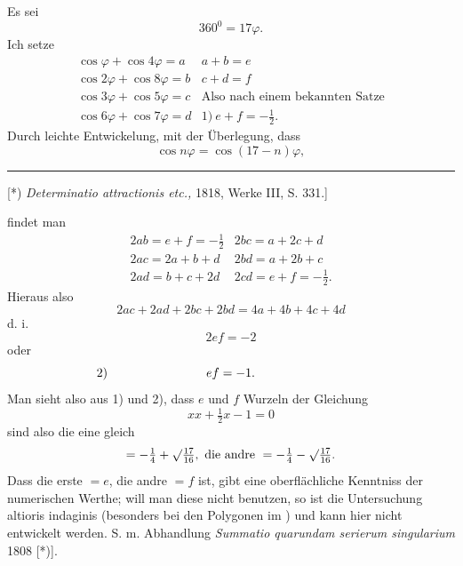 Es sei
\[360^0=17\varphi.\]
\noindent Ich setze
\[\begin{array}{l|l}
\cos\varphi+\cos4\varphi=a&a+b=e\\
\cos2\varphi+\cos8\varphi=b&c+d=f\\
\cos3\varphi+\cos5\varphi=c&\text{Also nach einem bekannten Satze}\\
\cos6\varphi+\cos7\varphi=d&1)\ e+f=-\tfrac12.
\end{array}\]
\noindent Durch leichte Entwickelung, mit der Überlegung, dass
\[\cos n\varphi=\cos(17-n)\varphi,\]
\par\smallskip\noindent\rule{.25\linewidth}{.4pt}\par\smallskip
{\small\noindent\hspace*{\parindent}[*) \textit{Determinatio attractionis etc.,} 1818,
Werke III, S. 331.]\par}
\clearpage
{}
\noindent findet man
\[\begin{array}{l|l}
2ab=e+f=-\tfrac12&2bc=a+2c+d\\
2ac=2a+b+d&2bd=a+2b+c\\
2ad=b+c+2d&2cd=e+f=-\tfrac12.
\end{array}\]
\noindent Hieraus also
\[2ac+2ad+2bc+2bd=4a+4b+4c+4d\]
\noindent d. i.
\[2ef=-2\]
\noindent oder
\[\makebox[0pt][r]{\hspace*{-10em}2)\hspace{8em}}ef=-1.\]
\noindent\hspace*{\parindent}Man sieht also aus 1) und 2), dass $e$ und $f$ Wurzeln der Gleichung
\[xx+\tfrac12x-1=0\]
\noindent sind also die eine gleich
\[=-\tfrac14+\surd\tfrac{17}{16},\ \text{die andre }=-\tfrac14-\surd\tfrac{17}{16}.\]
\noindent Dass die erste $=e$, die andre $=f$ ist, gibt eine oberflächliche Kenntniss der
numerischen Werthe; will man diese nicht benutzen, so ist die Untersuchung altioris indaginis
(besonders bei den Polygonen im ) und kann hier nicht entwickelt werden.
S. m. Abhandlung \textit{Summatio quarundam serierum singularium} 1808 [*)].

